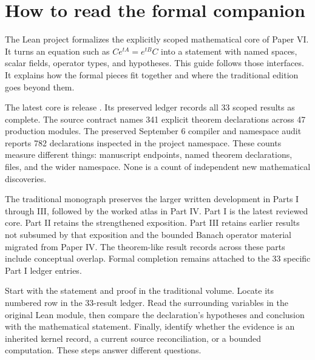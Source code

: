 \section{How to read the formal companion}
\label{sec:reading}
The Lean project formalizes the explicitly scoped mathematical core of Paper VI. It turns an equation such as $Ce^{tA}=e^{tB}C$ into a statement with named spaces, scalar fields, operator types, and hypotheses. This guide follows those interfaces. It explains how the formal pieces fit together and where the traditional edition goes beyond them.

The latest core is release . Its preserved ledger records all 33 scoped results as complete. The source contract names 341 explicit theorem declarations across 47 production modules. The preserved September 6 compiler and namespace audit reports 782 declarations inspected in the project namespace. These counts measure different things: manuscript endpoints, named theorem declarations, files, and the wider namespace. None is a count of independent new mathematical discoveries.

The traditional monograph preserves the larger written development in Parts I through III, followed by the worked atlas in Part IV. Part I is the latest reviewed core. Part II retains the strengthened exposition. Part III retains earlier results not subsumed by that exposition and the bounded Banach operator material migrated from Paper IV. The theorem-like result records across these parts include conceptual overlap. Formal completion remains attached to the 33 specific Part I ledger entries.

\begin{readerroadmap}[title={Read one endpoint through its whole interface}]
Start with the statement and proof in the traditional volume. Locate its numbered row in the 33-result ledger. Read the surrounding variables in the original Lean module, then compare the declaration's hypotheses and conclusion with the mathematical statement. Finally, identify whether the evidence is an inherited kernel record, a current source reconciliation, or a bounded computation. These steps answer different questions.
\end{readerroadmap}


